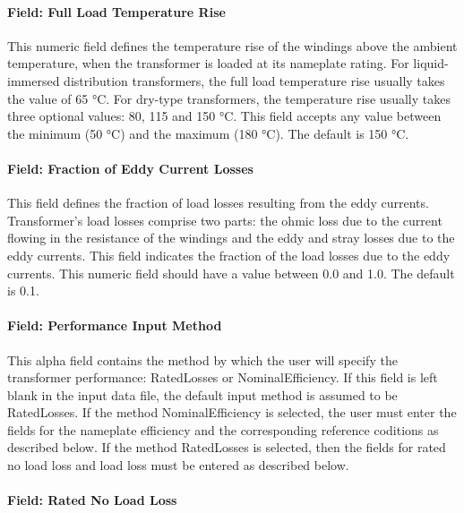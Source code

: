 \paragraph{Field: Full Load Temperature Rise}\label{field-full-load-temperature-rise}

This numeric field defines the temperature rise of the windings above the ambient temperature, when the transformer is loaded at its nameplate rating. For liquid-immersed distribution transformers, the full load temperature rise usually takes the value of 65 °C. For dry-type transformers, the temperature rise usually takes three optional values: 80, 115 and 150 °C. This field accepts any value between the minimum (50 °C) and the maximum (180 °C). The default is 150 °C.

\paragraph{Field: Fraction of Eddy Current Losses}\label{field-fraction-of-eddy-current-losses}

This field defines the fraction of load losses resulting from the eddy currents. Transformer's load losses comprise two parts: the ohmic loss due to the current flowing in the resistance of the windings and the eddy and stray losses due to the eddy currents. This field indicates the fraction of the load losses due to the eddy currents. This numeric field should have a value between 0.0 and 1.0. The default is 0.1.

\paragraph{Field: Performance Input Method}\label{field-performance-input-method-000}

This alpha field contains the method by which the user will specify the transformer performance: RatedLosses or NominalEfficiency. If this field is left blank in the input data file, the default input method is assumed to be RatedLosses. If the method NominalEfficiency is selected, the user must enter the fields for the nameplate efficiency and the corresponding reference coditions as described below. If the method RatedLosses is selected, then the fields for rated no load loss and load loss must be entered as described below.

\paragraph{Field: Rated No Load Loss}\label{field-rated-no-load-loss}

